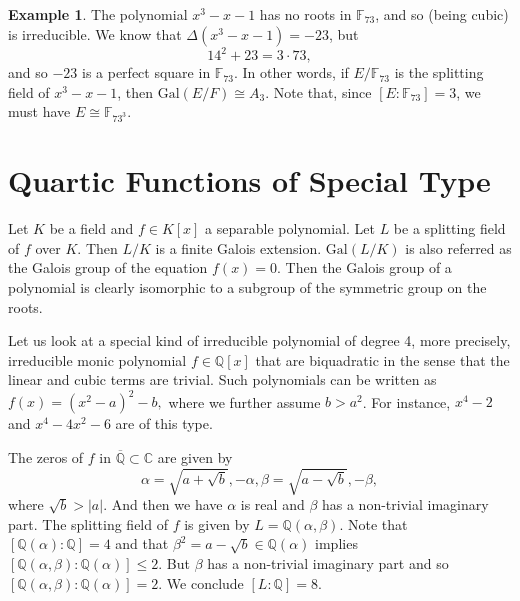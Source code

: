 \documentclass[12pt]{report}
\theoremstyle{definition}
\newtheorem{example}[theorem]{Example}
\newcommand{\Gal}{\text{Gal}}
\newcommand{\CC}{\mathbb{C}}
\newcommand{\QQ}{\mathbb{Q}}
\newcommand{\FF}{\mathbb{F}}
\begin{document}
\begin{example}
	The polynomial $x^3 -x-1$ has no roots in $\FF_{73}$, and so (being cubic) is irreducible. We know that $\Delta(x^3 - x - 1) = -23$, but
	$$14^2 + 23 = 3 \cdot 73,$$ and so $-23$ is a perfect square in $\FF_{73}$. In other words, if $E/\FF_{73}$ is the splitting field of $x^3 - x - 1$, then $\Gal(E/F) \cong A_3$. Note that, since $[E : \FF_{73}] = 3$, we must have $E \cong \FF_{73^3}$.
\end{example}

\section{Quartic Functions of Special Type}

Let $K$ be a field and $f\in K[x]$ a separable polynomial. Let $L$ be a splitting field of $f$ over $K$. Then $L/K$ is a finite Galois extension. $\Gal(L/K)$ is also referred as the Galois group of the equation $f(x)=0$. Then the Galois group of a polynomial is clearly isomorphic to a subgroup of the symmetric group on the roots.

Let us look at a special kind of irreducible polynomial of degree 4, more precisely, irreducible monic polynomial $f\in \QQ[x]$ that are biquadratic in the sense that the linear and cubic terms are trivial. Such polynomials can be written as $f(x)=(x^2-a)^2-b,$ where we further assume $b>a^2$. For instance, $x^4-2$ and $x^4-4x^2-6$ are of this type.

The zeros of $f$ in $\overline{\QQ}\subset \CC$ are given by
$$\alpha=\sqrt{a+\sqrt{b}},-\alpha,\beta=\sqrt{a-\sqrt{b}},-\beta,$$ where $\sqrt{b}>|a|$. And then we have $\alpha$ is real and $\beta$ has a non-trivial imaginary part. The splitting field of $f$ is given by $L=\QQ(\alpha,\beta)$. Note that $[\QQ(\alpha):\QQ]=4$ and that $\beta^2=a-\sqrt{b}\in \QQ(\alpha)$ implies $[\QQ(\alpha,\beta):\QQ(\alpha)]\leq 2$. But $\beta$ has a non-trivial imaginary part and so $[\QQ(\alpha,\beta):\QQ(\alpha)]=2$. We conclude $[L:\QQ]=8$.
\end{document}
